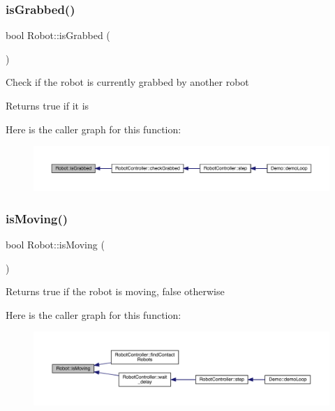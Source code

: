 \subsubsection{\texorpdfstring{is\+Grabbed()}{isGrabbed()}}
{\footnotesize\ttfamily bool Robot\+::is\+Grabbed (\begin{DoxyParamCaption}{ }\end{DoxyParamCaption})}

Check if the robot is currently grabbed by another robot \begin{DoxyReturn}{Returns}
true if it is 
\end{DoxyReturn}
Here is the caller graph for this function\+:\nopagebreak
\begin{figure}[H]
\begin{center}
\leavevmode
\includegraphics[width=350pt]{class_robot_a156c0ecf0bed5e117335d4c1c12d2d06_icgraph}
\end{center}
\end{figure}
\mbox{\label{class_robot_a885b7c6b9da718dfe4eb53802adfce92}} 
\subsubsection{\texorpdfstring{is\+Moving()}{isMoving()}}
{\footnotesize\ttfamily bool Robot\+::is\+Moving (\begin{DoxyParamCaption}{ }\end{DoxyParamCaption})}

\begin{DoxyReturn}{Returns}
true if the robot is moving, false otherwise 
\end{DoxyReturn}
Here is the caller graph for this function\+:\nopagebreak
\begin{figure}[H]
\begin{center}
\leavevmode
\includegraphics[width=350pt]{class_robot_a885b7c6b9da718dfe4eb53802adfce92_icgraph}
\end{center}
\end{figure}
\mbox{\label{class_robot_a521b65cb8bc45f7eae7bdaae0cd0f847}} 
